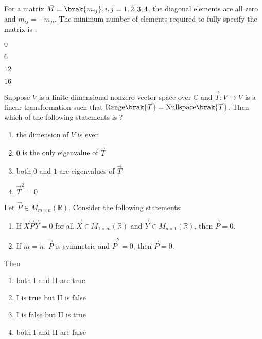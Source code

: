 \item For a matrix $\vec{M} = \brak{m_{ij}}, i,j = 1,2,3,4$, the diagonal elements are all zero and $m_{ij} = -m_{ji}$. The minimum number of elements required to fully specify the matrix is \underline{\hspace{2cm}}.
\hfill{}
\begin{enumerate}
\begin{multicols}{4}
\item $0$  
\item $6$  
\item $12$  
\item $16$  
\end{multicols}
\end{enumerate}
\item Suppose $V$ is a finite dimensional nonzero vector space over $\mathbb{C}$ and $\vec{T}: V\to V$ is a linear transformation such that $\text{Range}\brak{\vec{T}}=\text{Nullspace}\brak{\vec{T}}$. Then which of the following statements is ?
\hfill{}
\begin{multicols}{2}
\begin{enumerate}
\item the dimension of $V$ is even
\item $0$ is the only eigenvalue of $\vec{T}$
\item both $0$ and $1$ are eigenvalues of $\vec{T}$
\item $\vec{T}^{2}=0$
\end{enumerate}
\end{multicols}
\item Let $\vec{P} \in M_{m\times n}(\mathbb{R})$. Consider the following statements:
	\begin{enumerate}[label=\Roman*:]
		\item If $\vec{X}\vec{P}\vec{Y}=0$ for all $\vec{X} \in M_{1\times m}(\mathbb{R})$ and $\vec{Y} \in M_{n\times 1}(\mathbb{R})$, then $\vec{P}=0$.  
		\item  If $m=n$, $\vec{P}$ is symmetric and $\vec{P}^2=0$, then $\vec{P}=0$.  
\end{enumerate}
Then
\hfill{}
\begin{multicols}{2}
\begin{enumerate}
\item both I and II are true
\item I is true but II is false
\item I is false but II is true
\item both I and II are false
\end{enumerate}
\end{multicols}
